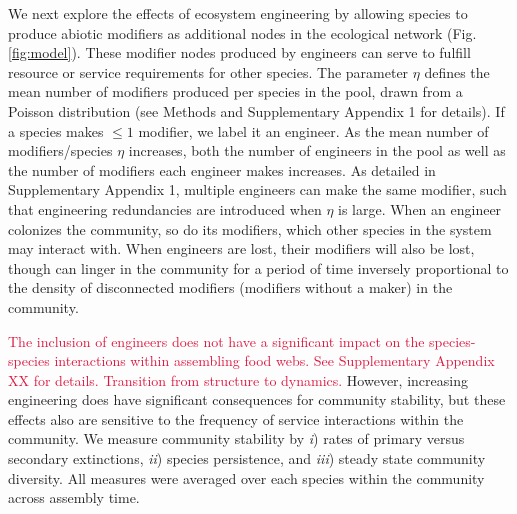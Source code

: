 \documentclass[twocolumn,preprintnumbers,amsmath,amssymb,superscriptaddress,linenumbers]{revtex4-1}
\newcommand{\rev}[1]{\textcolor{crimson}{#1}}
\begin{document}
We next explore the effects of ecosystem engineering by allowing species to produce abiotic modifiers as additional nodes in the ecological network (Fig. \ref{fig:model}).
These modifier nodes produced by engineers can serve to fulfill resource or service requirements for other species.
The parameter $\eta$ defines the mean number of modifiers produced per species in the pool, drawn from a Poisson distribution (see Methods and Supplementary Appendix 1 for details).
If a species makes $\leq 1$ modifier, we label it an engineer.
As the mean number of modifiers/species $\eta$ increases, both the number of engineers in the pool as well as the number of modifiers each engineer makes increases.
As detailed in Supplementary Appendix 1, multiple engineers can make the same modifier, such that engineering redundancies are introduced when $\eta$ is large.
When an engineer colonizes the community, so do its modifiers, which other species in the system may interact with.
When engineers are lost, their modifiers will also be lost, though can linger in the community for a period of time inversely proportional to the density of disconnected modifiers (modifiers without a maker) in the community.






\rev{The inclusion of engineers does not have a significant impact on the species-species interactions within assembling food webs.
See Supplementary Appendix XX for details.
Transition from structure to dynamics.}
However, increasing engineering does have significant consequences for community stability, but these effects also are sensitive to the frequency of service interactions within the community.
We measure community stability by 
\emph{i}) rates of primary versus secondary extinctions,
\emph{ii}) species persistence, and 
\emph{iii}) steady state community diversity.
All measures were averaged over each species within the community across assembly time.
\end{document}
